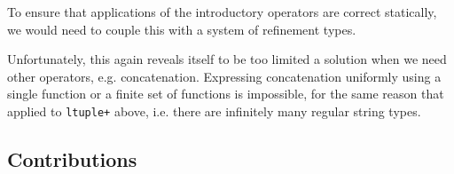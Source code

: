 To ensure that applications of the introductory operators are correct statically, we would need to couple this with a system of refinement types. 

Unfortunately, this again reveals itself to be too limited a solution when we need other operators, e.g. concatenation. Expressing concatenation uniformly using a single function or a finite set of functions is impossible, for the same reason that applied to \lstinline{ltuple+} above, i.e. there are infinitely many regular string types.

\subsection{Contributions}\label{sec:metamodules-approach}


